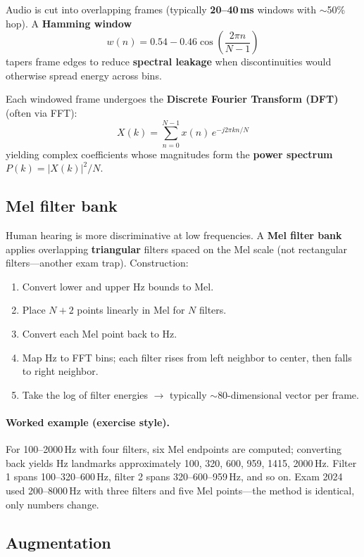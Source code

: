Audio is cut into overlapping frames (typically \textbf{20--40\,ms} windows with $\sim$50\% hop). A \textbf{Hamming window}
\[
w(n) = 0.54 - 0.46\cos\left(\frac{2\pi n}{N-1}\right)
\]
tapers frame edges to reduce \textbf{spectral leakage} when discontinuities would otherwise spread energy across bins.

Each windowed frame undergoes the \textbf{Discrete Fourier Transform (DFT)} (often via FFT):
\[
X(k) = \sum_{n=0}^{N-1} x(n)\, e^{-j 2\pi kn / N}
\]
yielding complex coefficients whose magnitudes form the \textbf{power spectrum} $P(k) = |X(k)|^2/N$.

\subsection{Mel filter bank}

Human hearing is more discriminative at low frequencies. A \textbf{Mel filter bank} applies overlapping \textbf{triangular} filters spaced on the Mel scale (not rectangular filters---another exam trap). Construction:
\begin{enumerate}
  \item Convert lower and upper Hz bounds to Mel.
  \item Place $N+2$ points linearly in Mel for $N$ filters.
  \item Convert each Mel point back to Hz.
  \item Map Hz to FFT bins; each filter rises from left neighbor to center, then falls to right neighbor.
  \item Take the log of filter energies $\rightarrow$ typically $\sim$80-dimensional vector per frame.
\end{enumerate}

\paragraph{Worked example (exercise style).}
For 100--2000\,Hz with four filters, six Mel endpoints are computed; converting back yields Hz landmarks approximately 100, 320, 600, 959, 1415, 2000\,Hz. Filter 1 spans 100--320--600\,Hz, filter 2 spans 320--600--959\,Hz, and so on. Exam 2024 used 200--8000\,Hz with three filters and five Mel points---the method is identical, only numbers change.

\subsection{Augmentation}

